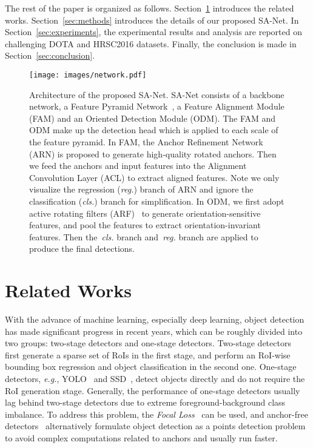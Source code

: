 \documentclass[10pt,journal,final]{IEEEtran}
\def\eg{{\em e.g.}}
\begin{document}
The rest of the paper is organized as follows. Section~\ref{sec:related_works} introduces the related works. 
Section~\ref{sec:methods} introduces the details of our proposed SA-Net. In Section~\ref{sec:experiments}, the experimental results and analysis are reported on challenging DOTA and HRSC2016 datasets. Finally, the conclusion is made in Section~\ref{sec:conclusion}.


\begin{figure*}[!t]
  \centering
  \texttt{[image: images/network.pdf]}
  \vspace{-2mm}
  \caption{Architecture of the proposed SA-Net. SA-Net consists of a backbone network, a Feature Pyramid Network~\cite{lin2017focal}, a Feature Alignment Module (FAM) and an Oriented Detection Module (ODM). The FAM and ODM make up the detection head which is applied to each scale of the feature pyramid. In FAM, the Anchor Refinement Network (ARN) is proposed to generate high-quality rotated anchors. Then we feed the anchors and input features into the Alignment Convolution Layer (ACL) to extract aligned features. Note we only visualize the regression (\emph{reg.}) branch of ARN and ignore the classification (\emph{cls.}) branch for simplification.  In ODM, we first adopt active rotating filters (ARF)~\cite{zhou2017orn} to generate orientation-sensitive features, and pool the features to extract orientation-invariant features. Then the~\emph{cls.} branch and~\emph{reg.} branch are applied to produce the final detections.}
  \label{fig:SA-Net}
  \vspace{-3mm}
\end{figure*}

\section{Related Works}
\label{sec:related_works}
With the advance of machine learning, especially deep learning, object detection has made significant progress in recent years, which can be roughly divided into two groups: two-stage detectors and one-stage detectors. Two-stage detectors~\cite{girshick2014rich, girshick2015fast, ren2017faster, he2017maskrcnn} first generate a sparse set of RoIs in the first stage, and perform an RoI-wise bounding box regression and object classification in the second one. One-stage detectors, \eg, YOLO~\cite{redmon2016you} and SSD~\cite{liu2016ssd}, detect objects directly and do not require the RoI generation stage. Generally, the performance of one-stage detectors usually lag behind two-stage detectors due to extreme foreground-background class imbalance. To address this problem, the {\em Focal Loss}~\cite{lin2017focal} can be used, and anchor-free detectors~\cite{Law2018cornernet, zhou2019objects,yang2019reppoints} alternatively formulate object detection as a points detection problem to avoid complex computations related to anchors and usually run faster.
\end{document}
